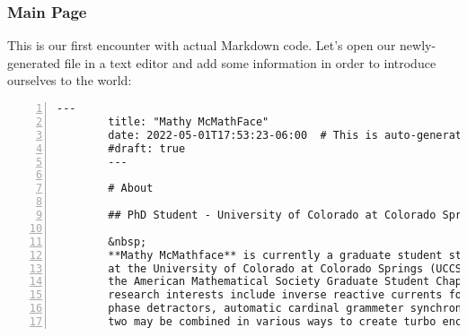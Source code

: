 \begin{frame}[fragile]
    \frametitle{Main Page}
    
    This is our first encounter with actual Markdown code. Let's open our newly-generated file
    in a text editor and add some information in order to introduce ourselves to the world:

    \vfill

    \begin{lstlisting}[style=saneCode,gobble=8,title={content/\_index.md},numbers=left]
        ---
        title: "Mathy McMathFace"
        date: 2022-05-01T17:53:23-06:00  # This is auto-generated - no need to modify!
        #draft: true
        ---
        
        # About
        
        ## PhD Student - University of Colorado at Colorado Springs
        
        &nbsp;
        **Mathy McMathface** is currently a graduate student studying Mathematics
        at the University of Colorado at Colorado Springs (UCCS) and is an officer for
        the American Mathematical Society Graduate Student Chapter at UCCS. Their
        research interests include inverse reactive currents for use in unilateral
        phase detractors, automatic cardinal grammeter synchronization, and how these
        two may be combined in various ways to create turbo encabulators.
    \end{lstlisting}
\end{frame}